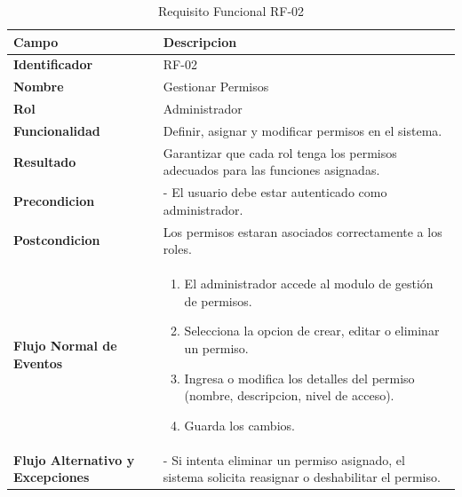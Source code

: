 \begin{table}[htb!]
\centering
\caption{Requisito Funcional RF-02}
\begin{tabular}{|p{3cm}|p{12cm}|}
\hline
\textbf{Campo} & \textbf{Descripcion} \\ \hline
\textbf{Identificador} & RF-02 \\ \hline
\textbf{Nombre} & Gestionar Permisos \\ \hline
\textbf{Rol} & Administrador \\ \hline
\textbf{Funcionalidad} & Definir, asignar y modificar permisos en el sistema. \\ \hline
\textbf{Resultado} & Garantizar que cada rol tenga los permisos adecuados para las funciones asignadas. \\ \hline
\textbf{Precondicion} & - El usuario debe estar autenticado como administrador. \\ \hline
\textbf{Postcondicion} & Los permisos estaran asociados correctamente a los roles. \\ \hline
\textbf{Flujo Normal de Eventos} & 
\begin{enumerate}
    \item El administrador accede al modulo de gestión de permisos. 
    \item Selecciona la opcion de crear, editar o eliminar un permiso. 
    \item Ingresa o modifica los detalles del permiso (nombre, descripcion, nivel de acceso). 
    \item Guarda los cambios.
    
\end{enumerate}
\\ \hline
\textbf{Flujo Alternativo y Excepciones} & 
- Si intenta eliminar un permiso asignado, el sistema solicita reasignar o deshabilitar el permiso. \\ \hline
\end{tabular}
\end{table}
\FloatBarrier

